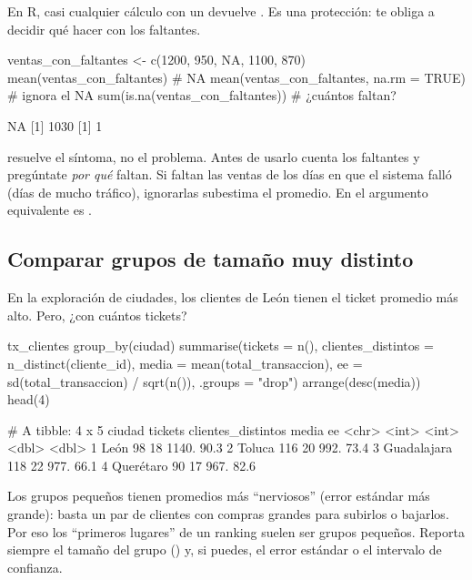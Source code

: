 En R, casi cualquier cálculo con un  devuelve . Es una
protección: te obliga a decidir qué hacer con los faltantes.

\begin{rcode}
ventas_con_faltantes <- c(1200, 950, NA, 1100, 870)
mean(ventas_con_faltantes)                 # NA
mean(ventas_con_faltantes, na.rm = TRUE)   # ignora el NA
sum(is.na(ventas_con_faltantes))           # ¿cuántos faltan?
\end{rcode}
\begin{rsalida}
[1] NA
[1] 1030
[1] 1
\end{rsalida}

\begin{advertencia}
 resuelve el síntoma, no el problema. Antes de usarlo
cuenta los faltantes y pregúntate \emph{por qué} faltan. Si faltan las ventas
de los días en que el sistema falló (días de mucho tráfico), ignorarlas
subestima el promedio. En  el argumento equivalente es
.
\end{advertencia}

\subsection{Comparar grupos de tamaño muy distinto}

En la exploración de ciudades, los clientes de León tienen el ticket
promedio más alto. Pero, ¿con cuántos tickets?

\begin{rcode}
tx_clientes %
  group_by(ciudad) %
  summarise(tickets = n(),
            clientes_distintos = n_distinct(cliente_id),
            media = mean(total_transaccion),
            ee    = sd(total_transaccion) / sqrt(n()),
            .groups = "drop") %
  arrange(desc(media)) %
  head(4)
\end{rcode}
\begin{rsalida}
# A tibble: 4 x 5
  ciudad      tickets clientes_distintos media    ee
  <chr>         <int>              <int> <dbl> <dbl>
1 León             98                 18 1140.  90.3
2 Toluca          116                 20  992.  73.4
3 Guadalajara     118                 22  977.  66.1
4 Querétaro        90                 17  967.  82.6
\end{rsalida}

Los grupos pequeños tienen promedios más ``nerviosos'' (error estándar más
grande): basta un par de clientes con compras grandes para subirlos o
bajarlos. Por eso los ``primeros lugares'' de un ranking suelen ser grupos
pequeños. Reporta siempre el tamaño del grupo () y, si puedes, el
error estándar o el intervalo de confianza.

